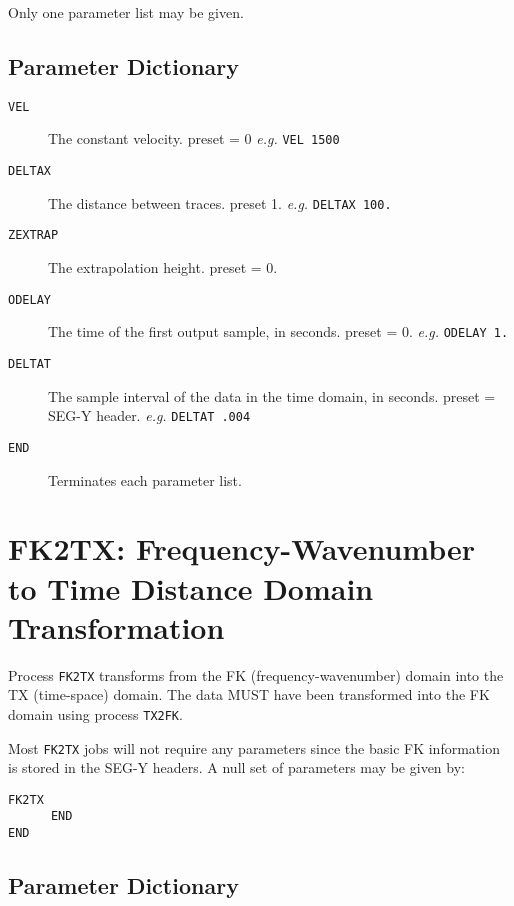 Only one parameter list may be given.

\subsection{Parameter Dictionary}

\begin{description}
\item[\texttt{VEL}] The constant velocity.
          \Gls{preset} = 0     \textit{e.g.} \texttt{VEL 1500}

\item[\texttt{DELTAX}] The distance between traces.
          \Gls{preset} 1. \textit{e.g.} \texttt{DELTAX 100.}

\item[\texttt{ZEXTRAP}] The extrapolation height.
          \Gls{preset} = 0.

\item[\texttt{ODELAY}] The time of the first output sample, in seconds.
          \Gls{preset} = 0.    \textit{e.g.}  \texttt{ODELAY 1.}

\item[\texttt{DELTAT}] The sample interval of the data in the time domain, in seconds.
          \Gls{preset} = SEG-Y header.   \textit{e.g.}  \texttt{DELTAT .004}

\item[\texttt{END}] Terminates each parameter list.
\end{description}

\section{FK2TX: Frequency-Wavenumber to Time Distance Domain Transformation}
\label{cmd_fk2tx}

Process \texttt{FK2TX} transforms from the FK (frequency-wavenumber) domain into
the TX (time-space) domain.  The data MUST have been transformed into
the FK domain using process \texttt{TX2FK}.

Most \texttt{FK2TX} jobs will not require any parameters since the basic FK
information is stored in the SEG-Y headers.  A null set of parameters
may be given by:
\begin{verbatim}
FK2TX
      END
END
\end{verbatim}

\subsection{Parameter Dictionary}

